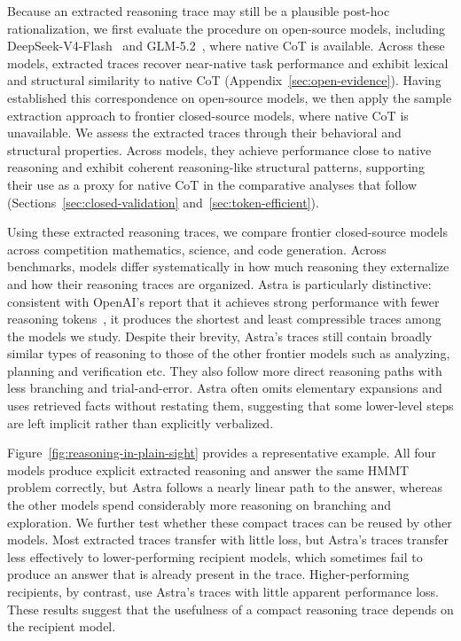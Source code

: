 \documentclass[10pt,letterpaper]{article}
\begin{document}
Because an extracted reasoning trace may still be a plausible post-hoc rationalization, we first evaluate the procedure on open-source models, including DeepSeek-V4-Flash~\citep{deepseekai2026deepseekv4} and GLM-5.2~\citep{glm5team2026glm5vibecodingagentic}, where native CoT is available.
Across these models, extracted traces recover near-native task performance and exhibit lexical and structural similarity to native CoT (Appendix~\ref{sec:open-evidence}).
Having established this correspondence on open-source models, we then apply the sample extraction approach to frontier closed-source models, where native CoT is unavailable.
We assess the extracted traces through their behavioral and structural properties.
Across models, they achieve performance close to native reasoning and exhibit coherent reasoning-like structural patterns, supporting their use as a proxy for native CoT in the comparative analyses that follow (Sections~\ref{sec:closed-validation} and~\ref{sec:token-efficient}).

Using these extracted reasoning traces, we compare frontier closed-source models across competition mathematics, science, and code generation.
Across benchmarks, models differ systematically in how much reasoning they externalize and how their reasoning traces are organized.
Astra is particularly distinctive: consistent with OpenAI's report that it achieves strong performance with fewer reasoning tokens~\citep{openai2026astra}, it produces the shortest and least compressible traces among the models we study.
Despite their brevity, Astra's traces still contain broadly similar types of reasoning to those of the other frontier models such as analyzing, planning and verification etc.
They also follow more direct reasoning paths with less branching and trial-and-error.
Astra often omits elementary expansions and uses retrieved facts without restating them, suggesting that some lower-level steps are left implicit rather than explicitly verbalized.

Figure~\ref{fig:reasoning-in-plain-sight} provides a representative example.
All four models produce explicit extracted reasoning and answer the same HMMT problem correctly, but Astra follows a nearly linear path to the answer, whereas the other models spend considerably more reasoning on branching and exploration.
We further test whether these compact traces can be reused by other models.
Most extracted traces transfer with little loss, but Astra's traces transfer less effectively to lower-performing recipient models, which sometimes fail to produce an answer that is already present in the trace.
Higher-performing recipients, by contrast, use Astra's traces with little apparent performance loss.
These results suggest that the usefulness of a compact reasoning trace depends on the recipient model.
\end{document}
